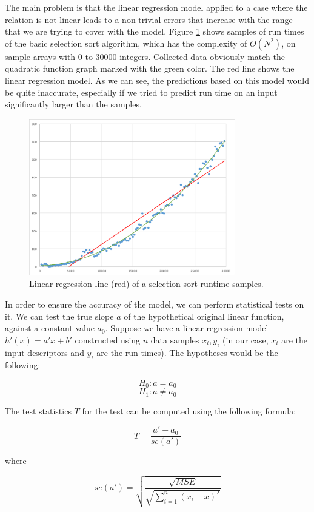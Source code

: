 The main problem is that the linear regression model applied to a case where the relation is not linear leads to a non-trivial errors that increase with the range that we are trying to cover with the model. Figure \ref{fig:selection_sort_linear_trendline} shows samples of run times of the basic selection sort algorithm, which has the complexity of \(O(N^2)\), on sample arrays with 0 to 30000 integers. Collected data obviously match the quadratic function graph marked with the green color. The red line shows the linear regression model. As we can see, the predictions based on this model would be quite inaccurate, especially if we tried to predict run time on an input significantly larger than the samples.

\begin{figure}[h!]
	\centerline{\mbox{\includegraphics[width=90mm]{./img/selection_sort_linear_trendline.png}}}
	\caption{Linear regression line (red) of a selection sort runtime samples.}
	\label{fig:selection_sort_linear_trendline}
\end{figure}

In order to ensure the accuracy of the model, we can perform statistical tests on it. We can test the true slope \(a\) of the hypothetical original linear function, against a constant value \(a_0\). Suppose we have a linear regression model \(h'(x) = a' x + b'\) constructed using \(n\) data samples \(x_i, y_i\) (in our case, \(x_i\) are the input descriptors and \(y_i\) are the run times). The hypotheses would be the following:

\[H_0: a = a_0\]
\[H_1: a \neq a_0 \]

The test statistics \(T\) for the test can be computed using the following formula:

\[T = \frac{a' - a_0}{se(a')}\]

where

\[se(a') = \sqrt{\frac{\sqrt{MSE}}{ \sqrt{ \sum_{i = 1}^{n} (x_i - \bar{x})^2 }}} \]

